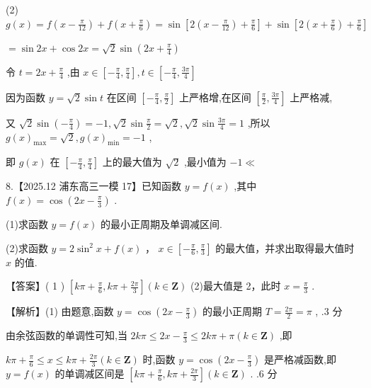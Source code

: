 \documentclass[10pt]{article}
\begin{document}
(2) \(g\left( x\right)  = f\left( {x - \frac{\pi }{12}}\right)  + f\left( {x + \frac{\pi }{6}}\right)  = \sin \left\lbrack  {2\left( {x - \frac{\pi }{12}}\right)  + \frac{\pi }{6}}\right\rbrack   + \sin \left\lbrack  {2\left( {x + \frac{\pi }{6}}\right)  + \frac{\pi }{6}}\right\rbrack\)

\(= \sin {2x} + \cos {2x} = \sqrt{2}\sin \left( {{2x} + \frac{\pi }{4}}\right)\)

令 \(t = {2x} + \frac{\pi }{4}\) ,由 \(x \in  \left\lbrack  {-\frac{\pi }{4},\frac{\pi }{4}}\right\rbrack  ,t \in  \left\lbrack  {-\frac{\pi }{4},\frac{3\pi }{4}}\right\rbrack\)

因为函数 \(y = \sqrt{2}\sin t\) 在区间 \(\left\lbrack  {-\frac{\pi }{4},\frac{\pi }{2}}\right\rbrack\) 上严格增,在区间 \(\left\lbrack  {\frac{\pi }{2},\frac{3\pi }{4}}\right\rbrack\) 上严格减,

又 \(\sqrt{2}\sin \left( {-\frac{\pi }{4}}\right)  =  - 1,\sqrt{2}\sin \frac{\pi }{2} = \sqrt{2},\sqrt{2}\sin \frac{3\pi }{4} = 1\) ,所以 \(g{\left( x\right) }_{\max } = \sqrt{2},g{\left( x\right) }_{\min } =  - 1\) ,

即 \(g\left( x\right)\) 在 \(\left\lbrack  {-\frac{\pi }{4},\frac{\pi }{4}}\right\rbrack\) 上的最大值为 \(\sqrt{2}\) ,最小值为 \(- 1 \ll\)

8.【2025.12 浦东高三一模 17】已知函数 \(y = f\left( x\right)\) ,其中 \(f\left( x\right)  = \cos \left( {{2x} - \frac{\pi }{3}}\right)\) .

(1)求函数 \(y = f\left( x\right)\) 的最小正周期及单调减区间.

(2)求函数 \(y = 2{\sin }^{2}x + f\left( x\right)\) ， \(x \in  \left\lbrack  {-\frac{\pi }{6},\frac{\pi }{3}}\right\rbrack\) 的最大值，并求出取得最大值时 \(x\) 的值.

【答案】( 1 ) \(\left\lbrack  {{k\pi } + \frac{\pi }{6},{k\pi } + \frac{2\pi }{3}}\right\rbrack  \left( {k \in  \mathbf{Z}}\right)\) (2)最大值是 2，此时 \(x = \frac{\pi }{3}\) .

【解析】(1) 由题意,函数 \(y = \cos \left( {{2x} - \frac{\pi }{3}}\right)\) 的最小正周期 \(T = \frac{2\pi }{2} = \pi\) , .3 分

由余弦函数的单调性可知,当 \({2k\pi } \leq  {2x} - \frac{\pi }{3} \leq  {2k\pi } + \pi \left( {k \in  \mathbf{Z}}\right)\) ,即

\({k\pi } + \frac{\pi }{6} \leq  x \leq  {k\pi } + \frac{2\pi }{3}\left( {k \in  \mathbf{Z}}\right)\) 时,函数 \(y = \cos \left( {{2x} - \frac{\pi }{3}}\right)\) 是严格减函数,即 \(y = f\left( x\right)\) 的单调减区间是 \(\left\lbrack  {{k\pi } + \frac{\pi }{6},{k\pi } + \frac{2\pi }{3}}\right\rbrack  \left( {k \in  \mathbf{Z}}\right)\) . .6 分
\end{document}
